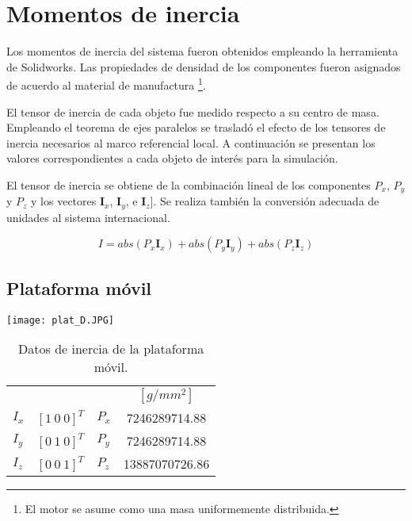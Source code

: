 \section{Momentos de inercia}
\label{sec: inertia}

Los momentos de inercia del sistema fueron obtenidos
empleando la herramienta de Solidworks. 
Las propiedades de densidad de los componentes 
fueron asignados de acuerdo al material de manufactura
\footnote{El motor se asume como una masa uniformemente distribuida.}.

El tensor de inercia de cada objeto fue medido respecto a su centro de masa.
Empleando el teorema de ejes paralelos 
\cite{olguin20183d}
se trasladó el efecto de los tensores de inercia necesarios al marco referencial local.
A continuación se presentan los valores correspondientes a cada objeto de interés para la simulación.

El tensor de inercia se obtiene de la combinación lineal 
de los componentes $P_x$, $P_y$ y $P_z$ y los vectores $\mathbf I_x$, $\mathbf I_y$, e $\mathbf I_z]$.
Se realiza también la conversión adecuada de unidades al
sistema internacional.

\begin{equation*}
 I = abs(P_x \mathbf I_x) + abs(P_y \mathbf I_y) +abs(P_z \mathbf I_z)
\end{equation*}

\subsection{Plataforma móvil}
\texttt{[image: plat\_D.JPG]}

% 

\begin{table}[hb!]
 \begin{center}
\begin{tabular}{lclc}
 & & & $[g/mm^2]$\\
 $ I_x $ & $ [1 \ 0 \ 0]^T $ & $ P_x $ & 7246289714.88\\
 $ I_y $ & $ [0 \ 1 \ 0]^T $ & $ P_y $ & 7246289714.88\\
 $ I_z $ & $ [0 \ 0 \ 1]^T $ & $ P_z $ & 13887070726.86
\end{tabular}
\end{center}
\caption{Datos de inercia de la plataforma móvil.}
\label{tab: inertia table platform}
\end{table}


